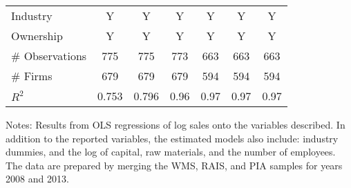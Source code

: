 \begin{table}[h t]
\begin{center}
\begin{tabular}{lcccccc}
Industry				& Y 		& 	Y 	& Y 		& 	Y 	& 	Y	& Y \\
Ownership			& Y 		& 	Y 	& Y 		& 	Y 	& 	Y	& Y \\
\# Observations              	& 775 	& 775 	& 773      & 663       & 663       & 663    \\
\# Firms                          	& 679 	& 679 	& 679      & 594       & 594       & 594    \\
$R^2 $                            	& 0.753 	& 0.796 	& 0.96     & 0.97      & 0.97      & 0.97      \\
\bottomrule
\end{tabular}
\end{center}
\footnotesize{Notes: Results from OLS regressions of log sales onto the variables described. In addition to the
reported variables, the estimated models also include: industry dummies, and the log of capital, raw materials, and the number of employees. The data are prepared by merging the WMS, RAIS, and PIA samples for years 2008 and 2013.
  }
\end{table}
